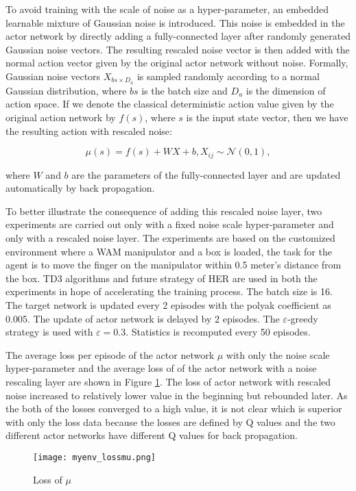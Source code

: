 \documentclass[a4paper, 12pt]{report}
\begin{document}
    To avoid training with the scale of noise as a hyper-parameter, an embedded learnable mixture of Gaussian noise is introduced. This noise is embedded in the actor network by directly adding a fully-connected layer after randomly generated Gaussian noise vectors. The resulting rescaled noise vector is then added with the normal action vector given by the original actor network without noise. Formally, Gaussian noise vectors $X_{bs\times D_a}$ is sampled randomly according to a normal Gaussian distribution, where $bs$ is the batch size and $D_a$ is the dimension of action space. If we denote the classical deterministic action value given by the original action network by $f(s)$, where $s$ is the input state vector, then we have the resulting action with rescaled noise:

    $$ \mu(s) = f(s) + W X + b, X_{ij}\sim\mathcal N(0,1),$$

    where $W$ and $b$ are the parameters of the fully-connected layer and are updated automatically by back propagation.

    To better illustrate the consequence of adding this rescaled noise layer, two experiments are carried out only with a fixed noise scale hyper-parameter and only with a rescaled noise layer. The experiments are based on the customized environment where a WAM manipulator and a box is loaded, the task for the agent is to move the finger on the manipulator within 0.5 meter's distance from the box. TD3 algorithms and future strategy of HER are used in both the experiments in hope of accelerating the training process. The batch size is 16. The target network is updated every 2 episodes with the polyak coefficient as 0.005. The update of actor network is delayed by 2 episodes. The $\varepsilon$-greedy strategy is used with $\varepsilon=0.3$. Statistics is recomputed every 50 episodes.
    

    The average loss per episode of the actor network $\mu$ with only the noise scale hyper-parameter and the average loss of of the actor network with a noise rescaling layer are shown in Figure \ref{fcn_lossmu}. The loss of actor network with rescaled noise increased to relatively lower value in the beginning but rebounded later. As the both of the losses converged to a high value, it is not clear which is superior with only the loss data because the losses are defined by Q values and the two different actor networks have different Q values for back propagation.

        \begin{figure}[H]
        \centering
        \texttt{[image: myenv\_lossmu.png]}
        \caption{Loss of $\mu$}
            \label{fcn_lossmu}
        \end{figure}
\end{document}

